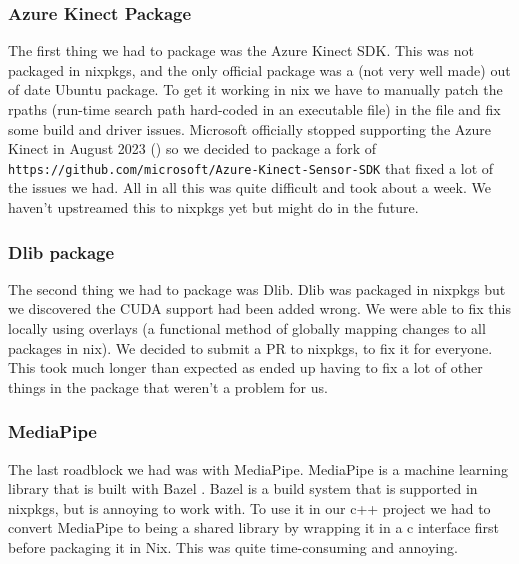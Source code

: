 \subsubsection{Azure Kinect Package}

The first thing we had to package was the Azure Kinect SDK. This was not packaged in nixpkgs, and the only official package was a (not very well made) out of date Ubuntu package. To get it working in nix we have to manually patch the rpaths (run-time search path hard-coded in an executable file) in the file and fix some build and driver issues.  Microsoft officially stopped supporting the Azure Kinect in August 2023 (\tocite) so we decided to package a fork of \texttt{https://github.com/microsoft/Azure-Kinect-Sensor-SDK} that fixed a lot of the issues we had. All in all this was quite difficult and took about a week. We haven't upstreamed this to nixpkgs yet but might do in the future.

\subsubsection{Dlib package}

The second thing we had to package was Dlib. Dlib was packaged in nixpkgs but we discovered the CUDA support had been added wrong. We were able to fix this locally using overlays (a functional method of globally mapping changes to all packages in nix). We decided to submit a PR \tocite to nixpkgs, to fix it for everyone. This took much longer than expected as ended up having to fix a lot of other things in the package that weren't a problem for us.

\subsubsection{MediaPipe}

The last roadblock we had was with MediaPipe. MediaPipe is a machine learning library that is built with Bazel \tocite. Bazel is a build system that is supported in nixpkgs, but is annoying to work with. To use it in our c++ project we had to convert MediaPipe to being a shared library by wrapping it in a c interface first before packaging it in Nix. This was quite time-consuming and annoying.